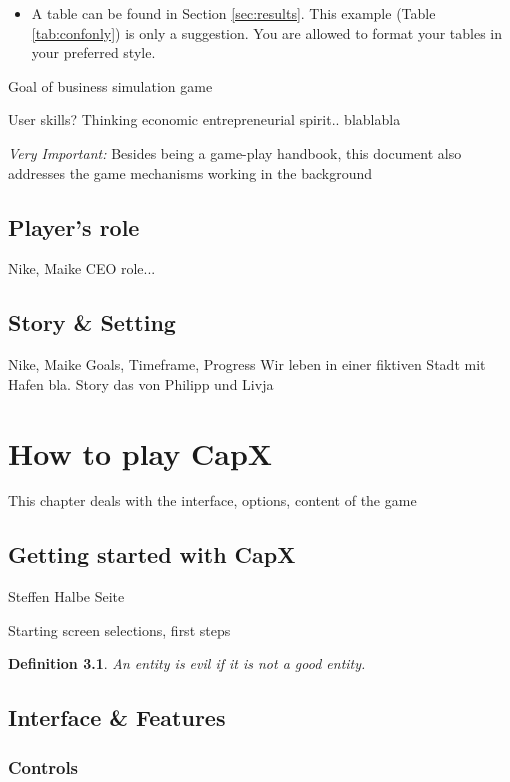 \documentclass[11pt,titlepage,oneside,openany]{book}
\newtheorem{definition}{Definition}
\begin{document}
\begin{itemize}
	\item A table can be found in Section \ref{sec:results}. This example (Table \ref{tab:confonly}) is only a suggestion. You are allowed to format your tables in your preferred style.
\end{itemize}

Goal of business simulation game

User skills? Thinking economic entrepreneurial spirit.. blablabla

\emph{Very Important:} Besides being a game-play handbook, this document also addresses the game mechanisms working in the background
 
\section{Player's role}
 Nike, Maike
CEO role... 

\section{Story \& Setting}
Nike, Maike
Goals, Timeframe, Progress
Wir leben in einer fiktiven Stadt mit Hafen bla.
Story das von Philipp und Livja
\chapter{How to play CapX}
\label{cha:theory}
 This chapter deals with the interface, options, content of the game

\section{Getting started with CapX}
Steffen
Halbe Seite

\label{sec:prelim}
Starting screen selections, first steps
\begin{definition}
\label{def:evil}
An entity is evil if it is not a good entity.
\end{definition}

\section{Interface \& Features}
\label{sec:good}

\subsection{Controls}
\end{document}
